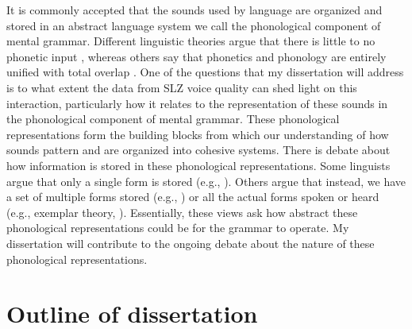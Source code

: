 \documentclass[12pt, letterpaper]{article}
\begin{document}
It is commonly accepted that the sounds used by language are organized and stored in an abstract language system we call the phonological component of mental grammar. Different linguistic theories argue that there is little to no phonetic input \citep{reissSubstanceFreePhonology2017}, whereas others say that phonetics and phonology are entirely unified with total overlap \citep{flemmingScalarCategoricalPhenomena2001}. One of the questions that my dissertation will address is to what extent the data from SLZ voice quality can shed light on this interaction, particularly how it relates to the representation of these sounds in the phonological component of mental grammar. These phonological representations form the building blocks from which our understanding of how sounds pattern and are organized into cohesive systems. There is debate about how information is stored in these phonological representations. Some linguists argue that only a single form is stored (e.g., \cite{albrightIdentificationBasesMorphological2002}). Others argue that instead, we have a set of multiple forms stored (e.g., \cite{mascaroExternalAllomorphyLexical2007}) or all the actual forms spoken or heard (e.g., exemplar theory, \cite{ernestusIntraparadigmaticEffectsPerception2007}). Essentially, these views ask how abstract these phonological representations could be for the grammar to operate. My dissertation will contribute to the ongoing debate about the nature of these phonological representations. 

\section{Outline of dissertation} \label{sec:Outline}

\end{document}
